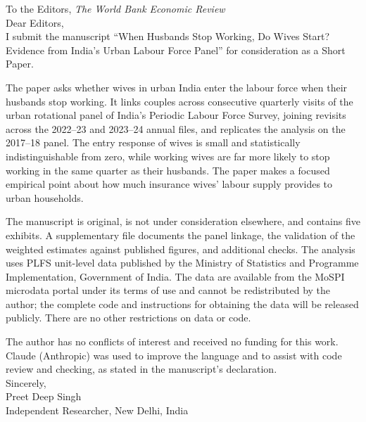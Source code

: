 \documentclass[12pt]{article}
\begin{document}
\noindent To the Editors, \textit{The World Bank Economic Review}\\[1em]
\noindent Dear Editors,\\[0.5em]
I submit the manuscript ``When Husbands Stop Working, Do Wives Start? Evidence from India's Urban Labour Force Panel'' for consideration as a Short Paper.

The paper asks whether wives in urban India enter the labour force when their husbands stop working. It links couples across consecutive quarterly visits of the urban rotational panel of India's Periodic Labour Force Survey, joining revisits across the 2022--23 and 2023--24 annual files, and replicates the analysis on the 2017--18 panel. The entry response of wives is small and statistically indistinguishable from zero, while working wives are far more likely to stop working in the same quarter as their husbands. The paper makes a focused empirical point about how much insurance wives' labour supply provides to urban households.

The manuscript is original, is not under consideration elsewhere, and contains five exhibits. A supplementary file documents the panel linkage, the validation of the weighted estimates against published figures, and additional checks. The analysis uses PLFS unit-level data published by the Ministry of Statistics and Programme Implementation, Government of India. The data are available from the MoSPI microdata portal under its terms of use and cannot be redistributed by the author; the complete code and instructions for obtaining the data will be released publicly. There are no other restrictions on data or code.

The author has no conflicts of interest and received no funding for this work. Claude (Anthropic) was used to improve the language and to assist with code review and checking, as stated in the manuscript's declaration.\\[1em]
Sincerely,\\[0.5em]
Preet Deep Singh\\
Independent Researcher, New Delhi, India
\end{document}
